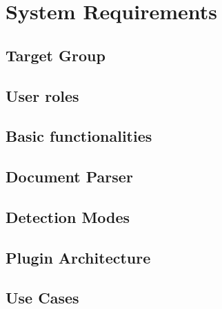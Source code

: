 \chapter{System Requirements}\label{chap:systemRequirements}

\section{Target Group}

\section{User roles}

\section{Basic functionalities}

\section{Document Parser}

\section{Detection Modes}

\section{Plugin Architecture}

\section{Use Cases}
